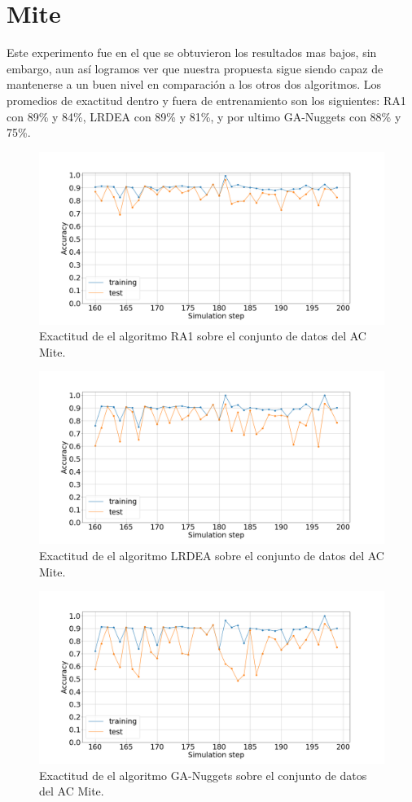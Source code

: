 \section{Mite}
Este experimento fue en el que se obtuvieron los resultados mas bajos, sin embargo, aun así logramos ver que nuestra propuesta sigue siendo capaz de mantenerse a un buen nivel en comparación a los otros dos algoritmos. Los promedios de exactitud dentro y fuera de entrenamiento son los siguientes: RA1 con 89\% y 84\%, LRDEA con 89\% y 81\%, y por ultimo GA-Nuggets con 88\% y 75\%.
\begin{figure}[H]
	\centering
	\includegraphics[width=\linewidth]{fig/ra1_9}
	\caption{Exactitud de el algoritmo RA1 sobre el conjunto de datos del AC Mite.}
	\label{fig:ra1mite}
\end{figure}
\begin{figure}[H]
	\centering
	\includegraphics[width=\linewidth]{fig/LRDEA_10}
	\caption{Exactitud de el algoritmo LRDEA sobre el conjunto de datos del AC Mite.}
	\label{fig:lrdeamite}
\end{figure}

\begin{figure}[H]
	\centering
	\includegraphics[width=\linewidth]{fig/GA-nuggets_11}
	\caption{Exactitud de el algoritmo GA-Nuggets sobre el conjunto de datos del AC Mite.}
	\label{fig:ganuggetsmite}
\end{figure}